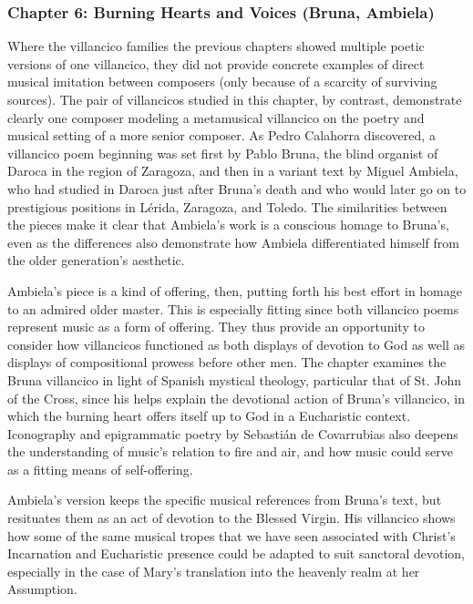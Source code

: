 \documentclass[tt]{vcbook-proposal}
\begin{document}
\subsubsection{Chapter 6: Burning Hearts and Voices (Bruna, Ambiela)}

Where the villancico families the previous chapters showed multiple poetic versions of one villancico, they did not provide concrete examples of direct musical imitation between composers (only because of a scarcity of surviving sources).
The pair of villancicos studied in this chapter, by contrast, demonstrate clearly one composer modeling a metamusical villancico on the poetry and musical setting of a more senior composer.
As Pedro Calahorra discovered, a villancico poem beginning  was set first by Pablo Bruna, the blind organist of Daroca in the region of Zaragoza, and then in a variant text by Miguel Ambiela, who had studied in Daroca just after Bruna's death and who would later go on to prestigious positions in Lérida, Zaragoza, and Toledo.
The similarities between the pieces make it clear that Ambiela's work is a conscious homage to Bruna's, even as the differences also demonstrate how Ambiela differentiated himself from the older generation's aesthetic. 

Ambiela's piece is a kind of offering, then, putting forth his best effort in homage to an admired older master.
This is especially fitting since both villancico poems represent music as a form of offering.
They thus provide an opportunity to consider how villancicos functioned as both displays of devotion to God as well as displays of compositional prowess before other men.
The chapter examines the Bruna villancico in light of Spanish mystical theology, particular that of St. John of the Cross, since his  helps explain the devotional action of Bruna's villancico, in which the burning heart offers itself up to God in a Eucharistic context.
Iconography and epigrammatic poetry by Sebastián de Covarrubias also deepens the understanding of music's relation to fire and air, and how music could serve as a fitting means of self-offering.

Ambiela's version keeps the specific musical references from Bruna's text, but resituates them as an act of devotion to the Blessed Virgin.
His villancico shows how some of the same musical tropes that we have seen associated with Christ's Incarnation and Eucharistic presence could be adapted to suit sanctoral devotion, especially in the case of Mary's translation into the heavenly realm at her Assumption.
\end{document}
